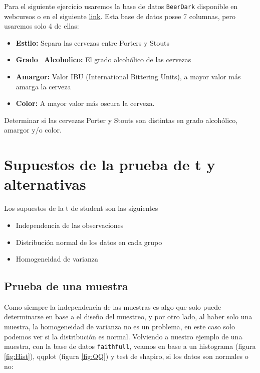 \documentclass[]{book}
\providecommand{\tightlist}{%
  \setlength{\itemsep}{0pt}\setlength{\parskip}{0pt}}
\begin{document}
Para el siguiente ejercicio usaremos la base de datos \texttt{BeerDark}
disponible en webcursos o en el siguiente
\href{https://archive.org/download/BeerDark/BeerDark.csv}{link}. Esta
base de datos posee 7 columnas, pero usaremos solo 4 de ellas:

\begin{itemize}
\tightlist
\item
  \textbf{Estilo:} Separa las cervezas entre Porters y Stouts
\item
  \textbf{Grado\_Alcoholico:} El grado alcohólico de las cervezas
\item
  \textbf{Amargor:} Valor IBU (International Bittering Units), a mayor
  valor más amarga la cerveza
\item
  \textbf{Color:} A mayor valor más oscura la cerveza.
\end{itemize}

Determinar si las cervezas Porter y Stouts son distintas en grado
alcohólico, amargor y/o color.

\section{Supuestos de la prueba de t y
alternativas}\label{supuestos-de-la-prueba-de-t-y-alternativas}

Los supuestos de la t de student son las siguientes
\citep{boneau1960effects}

\begin{itemize}
\tightlist
\item
  Independencia de las observaciones
\item
  Distribución normal de los datos en cada grupo
\item
  Homogeneidad de varianza
\end{itemize}

\subsection{Prueba de una muestra}\label{prueba-de-una-muestra}

Como siempre la independencia de las muestras es algo que solo puede
determinarse en base a el diseño del muestreo, y por otro lado, al haber
solo una muestra, la homogeneidad de varianza no es un problema, en este
caso solo podemos ver si la distribución es normal. Volviendo a nuestro
ejemplo de una muestra, con la base de datos \texttt{faithfull}, veamos
en base a un histograma (figura \ref{fig:Hist}), qqplot (figura
\ref{fig:QQ}) y test de shapiro, si los datos son normales o no:
\end{document}
